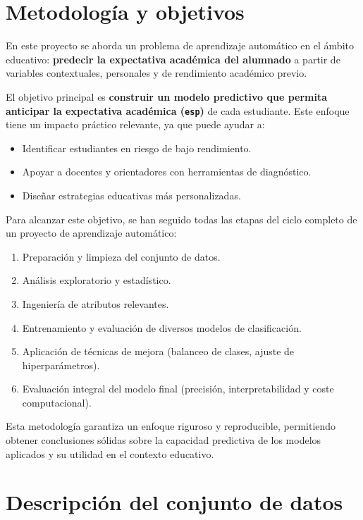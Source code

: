 \documentclass[11pt,a4paper]{article}
\begin{document}
\section{Metodología y objetivos}

En este proyecto se aborda un problema de aprendizaje automático en el ámbito educativo: \textbf{predecir la expectativa académica del alumnado} a partir de variables contextuales, personales y de rendimiento académico previo.

El objetivo principal es \textbf{construir un modelo predictivo que permita anticipar la expectativa académica (\texttt{esp})} de cada estudiante. Este enfoque tiene un impacto práctico relevante, ya que puede ayudar a:
\begin{itemize}
  \item Identificar estudiantes en riesgo de bajo rendimiento.
  \item Apoyar a docentes y orientadores con herramientas de diagnóstico.
  \item Diseñar estrategias educativas más personalizadas.
\end{itemize}

Para alcanzar este objetivo, se han seguido todas las etapas del ciclo completo de un proyecto de aprendizaje automático:
\begin{enumerate}
  \item Preparación y limpieza del conjunto de datos.
  \item Análisis exploratorio y estadístico.
  \item Ingeniería de atributos relevantes.
  \item Entrenamiento y evaluación de diversos modelos de clasificación.
  \item Aplicación de técnicas de mejora (balanceo de clases, ajuste de hiperparámetros).
  \item Evaluación integral del modelo final (precisión, interpretabilidad y coste computacional).
\end{enumerate}

Esta metodología garantiza un enfoque riguroso y reproducible, permitiendo obtener conclusiones sólidas sobre la capacidad predictiva de los modelos aplicados y su utilidad en el contexto educativo.

\section{Descripción del conjunto de datos}
\end{document}
